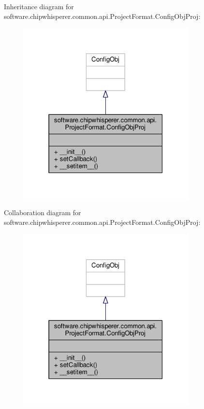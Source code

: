 Inheritance diagram for software.\+chipwhisperer.\+common.\+api.\+Project\+Format.\+Config\+Obj\+Proj\+:\nopagebreak
\begin{figure}[H]
\begin{center}
\leavevmode
\includegraphics[width=256pt]{d4/d10/classsoftware_1_1chipwhisperer_1_1common_1_1api_1_1ProjectFormat_1_1ConfigObjProj__inherit__graph}
\end{center}
\end{figure}


Collaboration diagram for software.\+chipwhisperer.\+common.\+api.\+Project\+Format.\+Config\+Obj\+Proj\+:\nopagebreak
\begin{figure}[H]
\begin{center}
\leavevmode
\includegraphics[width=256pt]{d4/dc9/classsoftware_1_1chipwhisperer_1_1common_1_1api_1_1ProjectFormat_1_1ConfigObjProj__coll__graph}
\end{center}
\end{figure}



